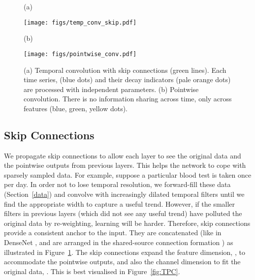 \documentclass[sigconf]{acmart}
\begin{document}
\begin{figure}
  \centering
  \begin{minipage}{0.05\textwidth}
    \centering
    (a)
  \end{minipage}
  \begin{minipage}{0.39\textwidth}
      \texttt{[image: figs/temp\_conv\_skip.pdf]}
      \vspace{0.1em}
  \end{minipage}
  \begin{minipage}{0.05\textwidth}
      \centering
    (b)
  \end{minipage}
  \begin{minipage}{0.39\textwidth}
  \texttt{[image: figs/pointwise\_conv.pdf]}
  \end{minipage}
  \caption{(a) Temporal convolution with skip connections (green lines). Each time series,  (blue dots) and their decay indicators (pale orange dots) are processed with independent parameters. (b) Pointwise convolution. There is no information sharing across time, only across features (blue, green, yellow dots).}
\label{fig:temp_pointwise}
\end{figure}

\subsection{Skip Connections}
\label{skip}
We propagate skip connections \citep{DBLP:journals/corr/HeZRS15} to allow each layer to see the original data and the pointwise outputs from previous layers. This helps the network to cope with sparsely sampled data. For example, suppose a particular blood test is taken once per day. In order not to lose temporal resolution, we forward-fill these data (Section~\ref{data}) and convolve with increasingly dilated temporal filters until we find the appropriate width to capture a useful trend. However, if the smaller filters in previous layers (which did not see any useful trend) have polluted the original data by re-weighting, learning will be harder. Therefore, skip connections provide a consistent anchor to the input. They are concatenated (like in DenseNet \citep{densenet}, and are arranged in the shared-source connection formation \citep{wang20188}) as illustrated in Figure~\ref{fig:temp_pointwise}. The skip connections expand the feature dimension, , to accommodate the pointwise outputs, and also the channel dimension to fit the original data, . This is best visualised in Figure~\ref{fig:TPC}.
\end{document}
